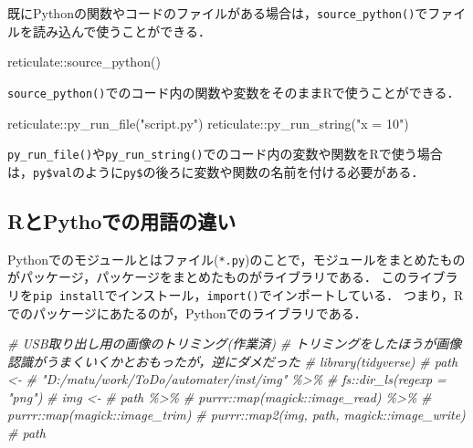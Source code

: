 \documentclass[
]{article}
\newenvironment{Shaded}{\begin{snugshade}}{\end{snugshade}}
\newcommand{\CommentTok}[1]{\textcolor[rgb]{0.56,0.35,0.01}{\textit{#1}}}
\newcommand{\FunctionTok}[1]{\textcolor[rgb]{0.00,0.00,0.00}{#1}}
\newcommand{\NormalTok}[1]{#1}
\newcommand{\SpecialCharTok}[1]{\textcolor[rgb]{0.00,0.00,0.00}{#1}}
\newcommand{\StringTok}[1]{\textcolor[rgb]{0.31,0.60,0.02}{#1}}
\begin{document}
既にPythonの関数やコードのファイルがある場合は，\texttt{source\_python()}でファイルを読み込んで使うことができる．

\begin{Shaded}
\begin{Highlighting}[]
\NormalTok{reticulate}\SpecialCharTok{::}\FunctionTok{source\_python}\NormalTok{()}
\end{Highlighting}
\end{Shaded}

\texttt{source\_python()}でのコード内の関数や変数をそのままRで使うことができる．

\begin{Shaded}
\begin{Highlighting}[]
\NormalTok{reticulate}\SpecialCharTok{::}\FunctionTok{py\_run\_file}\NormalTok{(}\StringTok{"script.py"}\NormalTok{)}
\NormalTok{reticulate}\SpecialCharTok{::}\FunctionTok{py\_run\_string}\NormalTok{(}\StringTok{"x = 10"}\NormalTok{)}
\end{Highlighting}
\end{Shaded}

\texttt{py\_run\_file()}や\texttt{py\_run\_string()}でのコード内の変数や関数をRで使う場合は，\texttt{py\$val}のように\texttt{py\$}の後ろに変数や関数の名前を付ける必要がある．

\hypertarget{rux3068pythoux3067ux306eux7528ux8a9eux306eux9055ux3044}{%
\subsection{RとPythoでの用語の違い}\label{rux3068pythoux3067ux306eux7528ux8a9eux306eux9055ux3044}}

Pythonでのモジュールとはファイル(\texttt{*.py})のことで，モジュールをまとめたものがパッケージ，パッケージをまとめたものがライブラリである．
このライブラリを\texttt{pip\ install}でインストール，\texttt{import()}でインポートしている．
つまり，Rでのパッケージにあたるのが，Pythonでのライブラリである．

\begin{Shaded}
\begin{Highlighting}[]
  \CommentTok{\# USB取り出し用の画像のトリミング(作業済)}
  \CommentTok{\#   トリミングをしたほうが画像認識がうまくいくかとおもったが，逆にダメだった}
  \CommentTok{\# library(tidyverse)}
  \CommentTok{\# path \textless{}{-} }
  \CommentTok{\#   "D:/matu/work/ToDo/automater/inst/img" \%\textgreater{}\%}
  \CommentTok{\#   fs::dir\_ls(regexp = "png") }
  \CommentTok{\# img \textless{}{-} }
  \CommentTok{\#   path \%\textgreater{}\%}
  \CommentTok{\#   purrr::map(magick::image\_read) \%\textgreater{}\%}
  \CommentTok{\#   purrr::map(magick::image\_trim)}
  \CommentTok{\# purrr::map2(img, path, magick::image\_write)}
  \CommentTok{\# path}
\end{Highlighting}
\end{Shaded}
\end{document}
